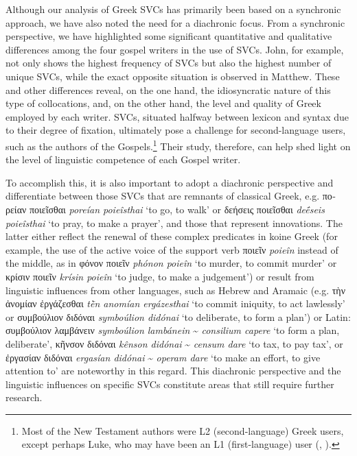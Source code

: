 \documentclass[output=paper,colorlinks,citecolor=brown]{langscibook}
\begin{document}
Although our analysis of Greek SVCs has primarily been based on a synchronic approach, we
have also noted the need for a diachronic focus. From a synchronic perspective, we have
highlighted some significant quantitative and qualitative differences among the four
gospel writers in the use of SVCs. John, for example, not only shows the highest frequency
of SVCs but also the highest number of unique SVCs, while the exact opposite situation is
observed in Matthew. These and other differences reveal, on the one hand, the
idiosyncratic nature of this type of collocations, and, on the other hand, the level and
quality of Greek employed by each writer. SVCs, situated halfway between lexicon and
syntax due to their degree of fixation, ultimately pose a challenge for second-language
users, such as the authors of the Gospels.\footnote{Most of the New Testament authors were
  L2 (second-language) Greek users, except perhaps Luke, who may have been an L1 (first-language)
  user (\cite[vol. IV]{MHTMoultonTurner1906}, \cite{PorterStanleyE-2014141}).} Their
study, therefore, can help shed light on the level of linguistic competence of each Gospel
writer.


To accomplish this, it is also important to adopt a diachronic perspective and
differentiate between those SVCs that are remnants of classical Greek, e.g.
\foreignlanguage{greek}{πορείαν} ποιεῖσθαι \emph{poreían poieîsthai} `to go, to walk' or
δεήσεις ποιεῖσθαι \emph{deḗseis poi\-eîsthai} `to pray, to make a prayer', and those
that represent innovations. The latter either reflect the renewal of these complex
predicates in koine Greek (for example, the use of the active voice of the support verb
ποιεῖν \textit{poieîn} instead of the middle, as in φόνον ποιεῖν \emph{phónon poieîn} `to murder, to
commit murder' or κρίσιν ποιεῖν \emph{krísin poieîn} `to judge, to make a judgement') or
result from linguistic influences from other languages, such as Hebrew and Aramaic (e.g.
τὴν ἀνομίαν ἐργάζεσθαι \emph{tḕn anomían ergázesthai} `to commit iniquity, to act
lawlessly' or συμβούλιον διδόναι \emph{symboúlion didónai} `to deliberate, to form a
plan') or Latin: συμβούλιον λαμβάνειν \emph{symboúlion lambánein} \textasciitilde{}
\emph{consilium capere} `to form a plan, deliberate', κῆνσον διδόναι \emph{kênson
  didónai} \textasciitilde{} \emph{censum dare} `to tax, to pay tax', or ἐργασίαν
διδόναι \emph{ergasían didónai} \textasciitilde{} \emph{operam dare} `to make an
effort, to give attention to' are noteworthy in this regard. This diachronic perspective
and the linguistic influences on specific SVCs constitute areas that still require further
research.
\end{document}

